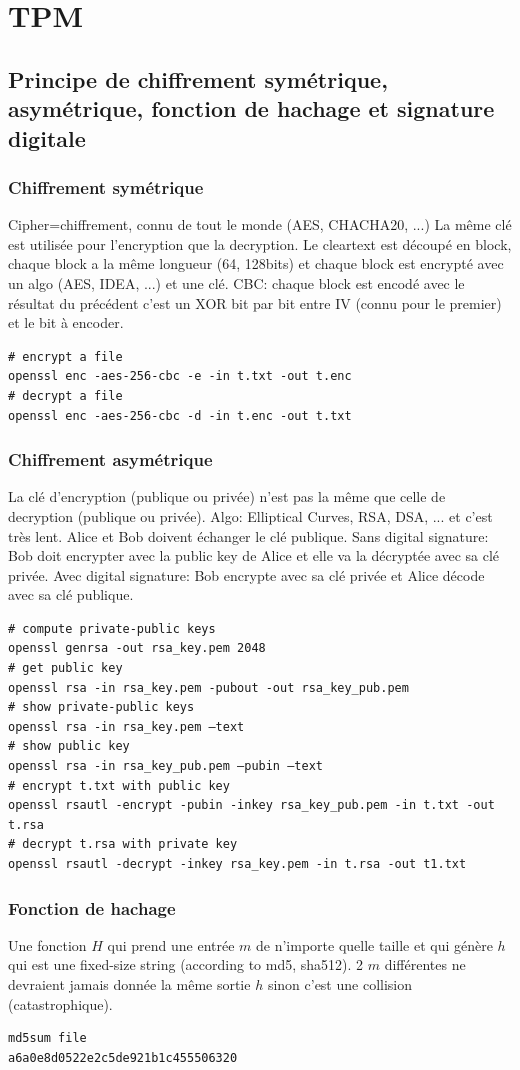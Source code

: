\section{TPM}
\subsection{Principe de chiffrement symétrique, asymétrique, fonction de hachage et signature digitale}
\subsubsection{Chiffrement symétrique}
Cipher=chiffrement, connu de tout le monde (AES, CHACHA20, ...)
La même clé est utilisée pour l'encryption que la decryption. Le cleartext est découpé en block, chaque block a la même longueur (64, 128bits) et chaque block est encrypté avec un algo (AES, IDEA, ...) et une clé. CBC: chaque block est encodé avec le résultat du précédent c'est un XOR bit par bit entre IV (connu pour le premier) et le bit à encoder.
\begin{Verbatim}[breaklines=true, breakanywhere=true]
# encrypt a file
openssl enc -aes-256-cbc -e -in t.txt -out t.enc
# decrypt a file
openssl enc -aes-256-cbc -d -in t.enc -out t.txt
\end{Verbatim}
\subsubsection{Chiffrement asymétrique}
La clé d'encryption (publique ou privée) n'est pas la même que celle de decryption (publique ou privée). Algo: Elliptical Curves, RSA, DSA, ... et c'est très lent.
Alice et Bob doivent échanger le clé publique. 
Sans digital signature: Bob doit encrypter avec la public key de Alice et elle va la décryptée avec sa clé privée. Avec digital signature: Bob encrypte avec sa clé privée et Alice décode avec sa clé publique.
\begin{Verbatim}[breaklines=true, breakanywhere=true]
# compute private-public keys
openssl genrsa -out rsa_key.pem 2048
# get public key
openssl rsa -in rsa_key.pem -pubout -out rsa_key_pub.pem
# show private-public keys
openssl rsa -in rsa_key.pem –text
# show public key
openssl rsa -in rsa_key_pub.pem –pubin –text
# encrypt t.txt with public key
openssl rsautl -encrypt -pubin -inkey rsa_key_pub.pem -in t.txt -out t.rsa
# decrypt t.rsa with private key
openssl rsautl -decrypt -inkey rsa_key.pem -in t.rsa -out t1.txt
\end{Verbatim}
\subsubsection{Fonction de hachage}
Une fonction $H$ qui prend une entrée $m$ de n'importe quelle taille et qui génère $h$ qui est une fixed-size string (according to md5, sha512). 2 $m$ différentes ne devraient jamais donnée la même sortie $h$ sinon c'est une collision (catastrophique).
\begin{Verbatim}[breaklines=true, breakanywhere=true]
md5sum file
a6a0e8d0522e2c5de921b1c455506320
\end{Verbatim}
